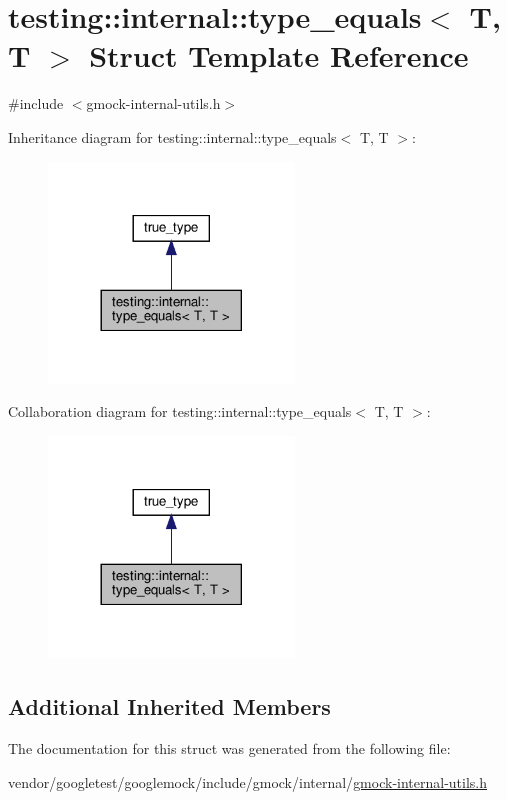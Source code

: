 \hypertarget{structtesting_1_1internal_1_1type__equals_3_01_t_00_01_t_01_4}{}\section{testing\+:\+:internal\+:\+:type\+\_\+equals$<$ T, T $>$ Struct Template Reference}
\label{structtesting_1_1internal_1_1type__equals_3_01_t_00_01_t_01_4}


{\ttfamily \#include $<$gmock-\/internal-\/utils.\+h$>$}



Inheritance diagram for testing\+:\+:internal\+:\+:type\+\_\+equals$<$ T, T $>$\+:
\nopagebreak
\begin{figure}[H]
\begin{center}
\leavevmode
\includegraphics[width=185pt]{structtesting_1_1internal_1_1type__equals_3_01_t_00_01_t_01_4__inherit__graph}
\end{center}
\end{figure}


Collaboration diagram for testing\+:\+:internal\+:\+:type\+\_\+equals$<$ T, T $>$\+:
\nopagebreak
\begin{figure}[H]
\begin{center}
\leavevmode
\includegraphics[width=185pt]{structtesting_1_1internal_1_1type__equals_3_01_t_00_01_t_01_4__coll__graph}
\end{center}
\end{figure}
\subsection*{Additional Inherited Members}


The documentation for this struct was generated from the following file\+:\begin{DoxyCompactItemize}
\item 
vendor/googletest/googlemock/include/gmock/internal/\hyperlink{gmock-internal-utils_8h}{gmock-\/internal-\/utils.\+h}\end{DoxyCompactItemize}
